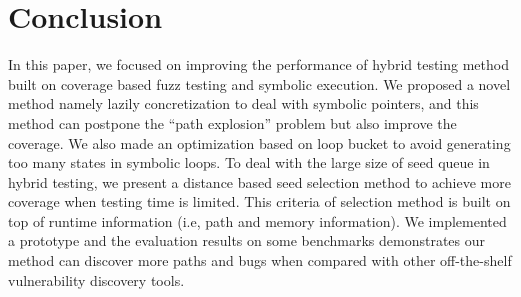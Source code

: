 \documentclass[a4paper]{article}
\begin{document}
\section{Conclusion} \label{sec:conclusion}
In this paper, we focused on improving the performance of hybrid testing method built on coverage based fuzz testing and symbolic execution. We proposed a novel method namely lazily concretization to deal with symbolic pointers, and this method can postpone the ``path explosion'' problem but also improve the coverage. We also made an optimization based on loop bucket to avoid generating too many states in symbolic loops. To deal with the large size of seed queue in hybrid testing, we present a distance based seed selection method to achieve more coverage when testing time is limited. This criteria of selection method is built on top of runtime information (i.e, path and memory information). We implemented a prototype and the evaluation results on some benchmarks demonstrates our method can discover more paths and bugs when compared with other off-the-shelf vulnerability discovery tools.



\end{document}
